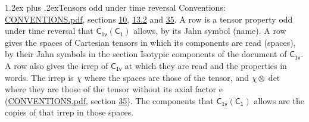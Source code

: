 \documentclass[10pt,a4paper]{article}
\makeatletter
\renewcommand\section{\@startsection{section}{1}{\z@}{-3ex plus -1ex minus -.2ex}%
  {1.2ex plus .2ex}{\normalfont\large\sffamily\bfseries\color{parttitle}}}
\numberwithin{equation}{section}
\newcommand{\grp}[1]{\mathsf{#1}}
\newcommand{\irrprod}{\otimes}
\makeatother
\begin{document}
\section{Tensors odd under time reversal}\label{s:time_odd}
Conventions: \href{../../CONVENTIONS.pdf}{CONVENTIONS.pdf}, sections \href{../../../rotation/CONVENTIONS.pdf\#conv.10}{10}, \href{../../../rotation/CONVENTIONS.pdf\#conv.13.2}{13.2} and \href{../../CONVENTIONS.pdf\#conv.35}{35}.
\leavevmode\label{n:head.name.property}A row is a tensor property odd under time reversal that $\grp{C_{1v}}(\grp{C_{1}})$ allows, by its Jahn symbol (name). \label{n:head.spaces}A row gives the spaces of Cartesian tensors in which its components are read (spaces), by their Jahn symbols in the section Isotypic components of the document of \href{../../../rotation/data/pdf/C1v.pdf}{$\grp{C_{1v}}$}. \label{n:head.properties}A row also gives the irrep of $\grp{C_{1v}}$ at which they are read and the properties in words. The irrep is $\chi$ where the spaces are those of the tensor, and $\chi \irrprod \det$ where they are those of the tensor without its axial factor e (\href{../../CONVENTIONS.pdf}{CONVENTIONS.pdf}, section \href{../../CONVENTIONS.pdf\#conv.35}{35}). The components that $\grp{C_{1v}}(\grp{C_{1}})$ allows are the copies of that irrep in those spaces.
\end{document}
